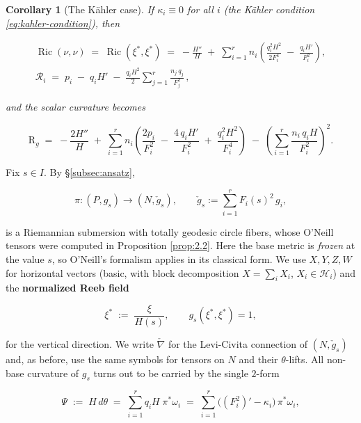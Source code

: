 \documentclass[11pt]{amsart}
\theoremstyle{plain}
\numberwithin{equation}{section}
\newtheorem{corollary}[theorem]{Corollary}
\theoremstyle{definition}
\theoremstyle{remark}
\begin{document}
\begin{corollary}[The Kähler case]\label{cor:ricci-kahler}
	If $\kappa_i \equiv 0$ for all $i$ (the Kähler condition \eqref{eq:kahler-condition}), then
	
	\begin{equation}\label{eq:ricci-kahler}
		\begin{gathered}
			\operatorname{Ric}(\nu, \nu) \;=\; \operatorname{Ric}(\xi^*, \xi^*) \;=\; -\frac{H''}{H} \;+\; \sum_{i=1}^r n_i \left( \frac{q_i^2 H^2}{2 F_i^4} \;-\; \frac{q_i H'}{F_i^2} \right), \\
			\mathcal{R}_i \;=\; p_i \;-\; q_i H' \;-\; \frac{q_i H^2}{2} \sum_{j=1}^r \frac{n_j\, q_j}{F_j^2} \,,
		\end{gathered}
	\end{equation}
	
	and the scalar curvature becomes
	
	\[
	\mathrm{R}_g \;=\; -\frac{2H''}{H} \;+\; \sum_{i=1}^r n_i \left( \frac{2 p_i}{F_i^2} \;-\; \frac{4\, q_i H'}{F_i^2} \;+\; \frac{q_i^2 H^2}{F_i^4} \right) \;-\; \left( \sum_{i=1}^r \frac{n_i\, q_i H}{F_i^2} \right)^{2} .
	\]
	
\end{corollary}

\iffalse
Fix $s \in I$. By \S\ref{subsec:ansatz},

\[
\pi : (P, g_s) \longrightarrow (N, \check{g}_s), \qquad \check{g}_s := \sum_{i=1}^r F_i(s)^2\, g_i ,
\]

is a Riemannian submersion with totally geodesic circle fibers, whose O'Neill tensors were computed in Proposition \ref{prop:2.2}. Here the base metric is \emph{frozen} at the value $s$, so O'Neill's formalism applies in its classical form. We use $X, Y, Z, W$ for horizontal vectors (basic, with block decomposition $X = \sum_i X_i$, $X_i \in \mathcal{H}_i$) and the \textbf{normalized Reeb field}

\[
\xi^* \;:=\; \frac{\xi}{H(s)}, \qquad g_s(\xi^*, \xi^*) = 1,
\]

for the vertical direction. We write $\check{\nabla}$ for the Levi-Civita connection of $(N, \check{g}_s)$ and, as before, use the same symbols for tensors on $N$ and their $\theta$-lifts. All non-base curvature of $g_s$ turns out to be carried by the single $2$-form

\begin{equation}\label{eq:Psi}
	\Psi \;:=\; H\, d\theta \;=\; \sum_{i=1}^r q_i H\; \pi^*\omega_i \;=\; \sum_{i=1}^r \Big( (F_i^2)' - \kappa_i \Big)\, \pi^*\omega_i ,
\end{equation}
\end{document}
